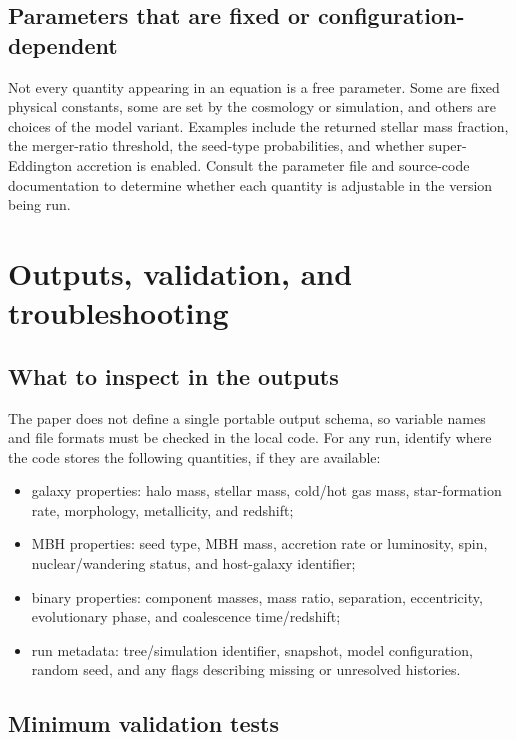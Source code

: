\documentclass[11pt,a4paper]{article}
\begin{document}
\subsection{Parameters that are fixed or configuration-dependent}

Not every quantity appearing in an equation is a free parameter. Some are fixed physical constants, some are set by the cosmology or simulation, and others are choices of the model variant. Examples include the returned stellar mass fraction, the merger-ratio threshold, the seed-type probabilities, and whether super-Eddington accretion is enabled. Consult the parameter file and source-code documentation to determine whether each quantity is adjustable in the version being run.

\section{Outputs, validation, and troubleshooting}

\subsection{What to inspect in the outputs}

The paper does not define a single portable output schema, so variable names and file formats must be checked in the local code. For any run, identify where the code stores the following quantities, if they are available:
\begin{itemize}
  \item galaxy properties: halo mass, stellar mass, cold/hot gas mass, star-formation rate, morphology, metallicity, and redshift;
  \item MBH properties: seed type, MBH mass, accretion rate or luminosity, spin, nuclear/wandering status, and host-galaxy identifier;
  \item binary properties: component masses, mass ratio, separation, eccentricity, evolutionary phase, and coalescence time/redshift;
  \item run metadata: tree/simulation identifier, snapshot, model configuration, random seed, and any flags describing missing or unresolved histories.
\end{itemize}

\subsection{Minimum validation tests}
\end{document}
